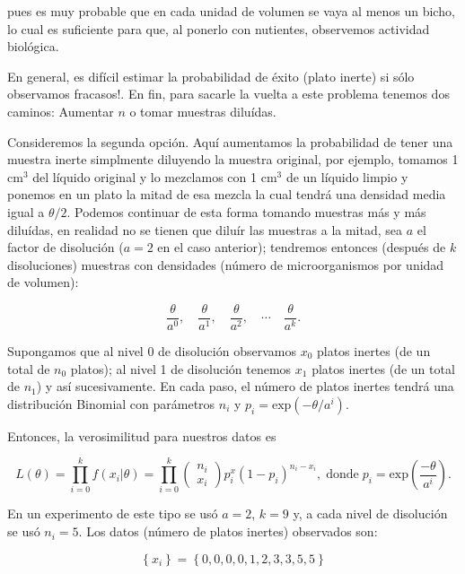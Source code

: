 \documentclass[letterpaper]{article}
\theoremstyle{definition}
\theoremstyle{lemathm}
\theoremstyle{lemathm}
\theoremstyle{lemathm}
\theoremstyle{lemademthm}
\newcommand{\1}{\mathbbm{1}}
\begin{document}
	pues es muy probable que en cada unidad de volumen se vaya al menos un bicho, lo cual es suficiente para que, al ponerlo con nutientes, observemos actividad biol\'ogica.

	En general, es dif\'icil estimar la probabilidad de \'exito (plato inerte) si s\'olo observamos fracasos!. En fin, para sacarle la vuelta a este problema tenemos dos caminos: Aumentar $n$ o tomar muestras dilu\'idas.

	Consideremos la segunda opci\'on. Aqu\'i aumentamos la probabilidad de tener una muestra inerte simplmente diluyendo la muestra original, por ejemplo, tomamos 1 cm$^3$ del l\'iquido original y lo mezclamos con 1 cm$^3$ de un l\'iquido limpio y ponemos en un plato la mitad de esa mezcla la cual tendr\'a una densidad media igual a $\theta/2$.
	Podemos continuar de esta forma tomando muestras m\'as y m\'as dilu\'idas, en realidad no se tienen que dilu\'ir las muestras a la mitad, sea $a$ el factor de disoluci\'on ($a=2$ en el caso anterior); tendremos entonces (despu\'es de $k$ disoluciones) muestras con densidades (n\'umero de microorganismos por unidad de volumen):
	
	\[\frac{\theta}{a^0}, \quad \frac{\theta}{a^1}, \quad \frac{\theta}{a^2}, \quad \cdots \quad \frac{\theta}{a^k}.\]

	Supongamos que al nivel 0 de disoluci\'on observamos $x_0$ platos inertes (de un total de $n_0$ platos); al nivel 1 de disoluci\'on tenemos $x_1$ platos inertes (de un total de $n_1$) y as\'i sucesivamente. En cada paso, el n\'umero de platos inertes tendr\'a una distribuci\'on Binomial con par\'ametros $n_i$ y $p_i = \text{exp}(-\theta /a^i)$.

	Entonces, la verosimilitud para nuestros datos es

	\[L(\theta) = \prod_{i=0}^k f(x_i | \theta) = \prod_{i=0}^k \left( \begin{array}{c} n_i \\ x_i \end{array} \right) p_i^x (1-p_i)^{n_i-x_i}, \; \text{donde} \; p_i = \text{exp}\left( \frac{-\theta}{a^i} \right).\]

	En un experimento de este tipo se us\'o $a=2$, $k=9$ y, a cada nivel de disoluci\'on se us\'o $n_i=5$. Los datos (n\'umero de platos inertes) observados son:

	\[\left\{ x_i \right\} = \left\{ 0,0,0,0,1,2,3,3,5,5 \right\}\]
\end{document}
